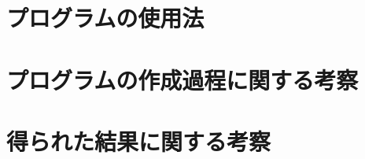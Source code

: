\documentclass[a4j]{jarticle}
\begin{document}
\section{プログラムの使用法}

\section{プログラムの作成過程に関する考察}

\section{得られた結果に関する考察}
\end{document}
